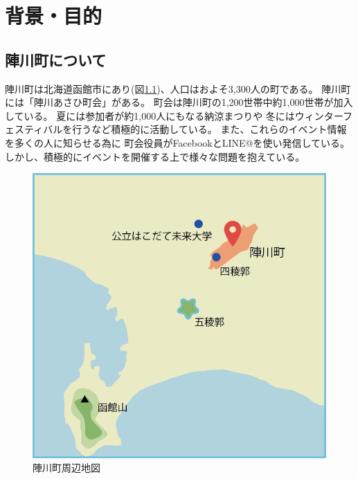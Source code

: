 \chapter{背景・目的}

\section{陣川町について}
陣川町は北海道函館市にあり(図\ref{map})、人口はおよそ3,300人の町である。
陣川町には「陣川あさひ町会」がある。
町会は陣川町の1,200世帯中約1,000世帯が加入している。
夏には参加者が約1,000人にもなる納涼まつりや
冬にはウィンターフェスティバルを行うなど積極的に活動している。
また、これらのイベント情報を多くの人に知らせる為に
町会役員がFacebookとLINE@を使い発信している。
しかし、積極的にイベントを開催する上で様々な問題を抱えている。
\\
\begin{figure}[h]
    \begin{center}
        \includegraphics[keepaspectratio, scale=0.7]{map.png}
        \caption{陣川町周辺地図}
        \label{map}
    \end{center}
\end{figure}

